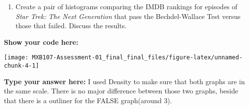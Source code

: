 \documentclass[
]{article}
\newenvironment{Shaded}{\begin{snugshade}}{\end{snugshade}}
\newcommand{\CharTok}[1]{\textcolor[rgb]{0.31,0.60,0.02}{#1}}
\newcommand{\CommentTok}[1]{\textcolor[rgb]{0.56,0.35,0.01}{\textit{#1}}}
\newcommand{\DataTypeTok}[1]{\textcolor[rgb]{0.13,0.29,0.53}{#1}}
\newcommand{\FloatTok}[1]{\textcolor[rgb]{0.00,0.00,0.81}{#1}}
\newcommand{\KeywordTok}[1]{\textcolor[rgb]{0.13,0.29,0.53}{\textbf{#1}}}
\newcommand{\NormalTok}[1]{#1}
\newcommand{\OperatorTok}[1]{\textcolor[rgb]{0.81,0.36,0.00}{\textbf{#1}}}
\newcommand{\StringTok}[1]{\textcolor[rgb]{0.31,0.60,0.02}{#1}}
\providecommand{\tightlist}{%
  \setlength{\itemsep}{0pt}\setlength{\parskip}{0pt}}
\begin{document}
\begin{enumerate}
\def\labelenumi{\alph{enumi}.}
\setcounter{enumi}{3}
\tightlist
\item
  Create a pair of histograms comparing the IMDB rankings for episodes
  of \emph{Star Trek: The Next Generation} that pass the Bechdel-Wallace
  Test versus those that failed. Discuss the results.
\end{enumerate}

\textbf{Show your code here:}

\begin{Shaded}
\end{Shaded}

\begin{center}\texttt{[image: MXB107-Assessment-01\_final\_final\_files/figure-latex/unnamed-chunk-4-1]} \end{center}

\textbf{Type your answer here:} I used Density to make sure that both
graphs are in the same scale. There is no major difference between those
two graphs, beside that there is a outliner for the FALSE graph(around
3).
\end{document}
